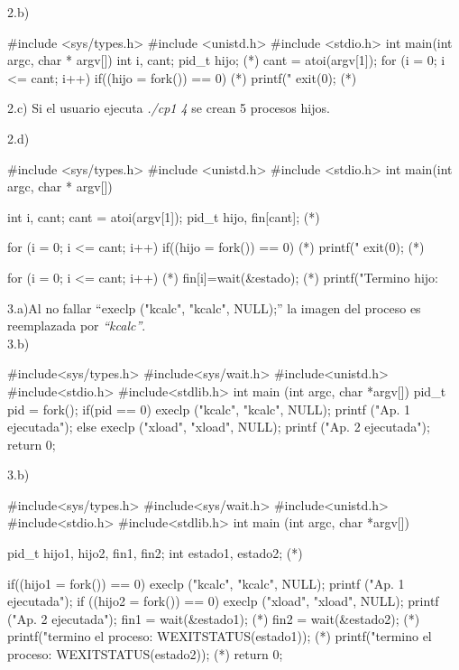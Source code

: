 \documentclass{article}
\begin{document}
2.b)
\begin{listing}{1}
#include <sys/types.h>
#include <unistd.h>
#include <stdio.h>
int main(int argc, char * argv[]) {
    int i, cant;
    pid_t hijo;                            (*)
    cant = atoi(argv[1]);
    for (i = 0; i <= cant; i++) {
        if((hijo = fork()) == 0){          (*)
            printf("%
            exit(0);                       (*)
        }
    }
}
\end{listing}

2.c) Si el usuario ejecuta \emph{./cp1 4} se crean 5 procesos hijos.

2.d)
\begin{listing}{1}
#include <sys/types.h>
#include <unistd.h>
#include <stdio.h>
int main(int argc, char * argv[]) {
    int i, cant;
    cant = atoi(argv[1]);
    pid_t hijo, fin[cant];                 (*)
    
    for (i = 0; i <= cant; i++) {
        if((hijo = fork()) == 0){          (*)
            printf("%
            exit(0);                       (*)
        }
    }
    
    for (i = 0; i <= cant; i++){           (*)
        fin[i]=wait(&estado);              (*)
        printf("Termino hijo: %
    }
}
\end{listing}

3.a)Al no fallar ``execlp ("kcalc", "kcalc", NULL);''
la imagen del proceso es reemplazada por \emph{``kcalc''}.\\

3.b)
\begin{listing}{1}
#include<sys/types.h>
#include<sys/wait.h>
#include<unistd.h>
#include<stdio.h>
#include<stdlib.h>
int main (int argc, char *argv[]) {
        pid_t pid = fork();
        if(pid == 0){
            execlp ("kcalc", "kcalc", NULL);
            printf ("Ap. 1 ejecutada\n");
        }else{
            execlp ("xload", "xload", NULL);
            printf ("Ap. 2 ejecutada\n");
        }
        return 0;
}
\end{listing}
3.b)
\begin{listing}{1}
#include<sys/types.h>
#include<sys/wait.h>
#include<unistd.h>
#include<stdio.h>
#include<stdlib.h>
int main (int argc, char *argv[]) {
        pid_t hijo1, hijo2, fin1, fin2;
        int estado1, estado2; (*)
        
        if((hijo1 = fork()) == 0){
            execlp ("kcalc", "kcalc", NULL);
            printf ("Ap. 1 ejecutada\n");
        }
        if ((hijo2 = fork()) == 0){
            execlp ("xload", "xload", NULL);
            printf ("Ap. 2 ejecutada\n");
        }
        fin1 = wait(&estado1); (*)
        fin2 = wait(&estado2); (*)
        printf("termino el proceso: %
                                  WEXITSTATUS(estado1)); (*)
        printf("termino el proceso: %
                                  WEXITSTATUS(estado2)); (*)
        return 0;
}
\end{listing}
\end{document}
